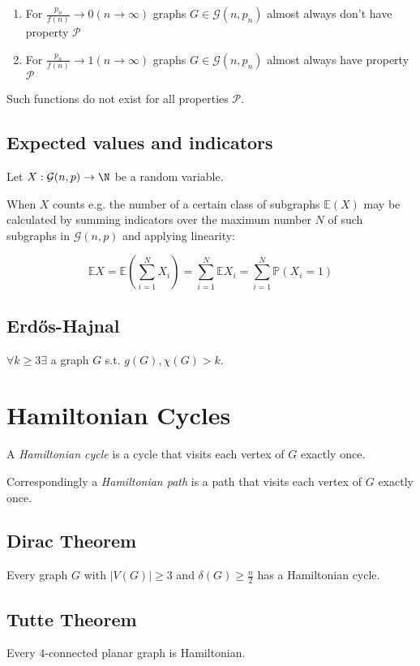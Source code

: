 \begin{enumerate}
	\item For $\frac{p_n}{f(n)} \to 0 (n \to \infty)$ graphs $G \in \mathcal{G}(n,p_n)$ almost always don't have property $\mathcal{P}$
	\item For $\frac{p_n}{f(n)} \to 1 (n \to \infty)$ graphs $G \in \mathcal{G}(n,p_n)$ almost always have property $\mathcal{P}$
\end{enumerate}

Such functions do not exist for all properties $\mathcal{P}$.

\subsection*{Expected values and indicators}

Let $X : \mathcal{G}(n,p) \to \N$ be a random variable.

When $X$ counts e.g. the number of a certain class of subgraphs $\mathbb{E}(X)$ may be calculated by summing indicators over the maximum number $N$ of such subgraphs in $\mathcal{G}(n,p)$ and applying linearity:

\vspace*{-4mm}
$$\mathbb{E}X = \mathbb{E}\left(\sum_{i=1}^N X_i\right) = \sum_{i=1}^N \mathbb{E}X_i = \sum_{i=1}^N \mathbb{P}(X_i=1)$$

\subsection*{Erd\H{o}s-Hajnal}

$\forall k \geq 3 \exists$ a graph $G$ s.t. $g(G), \chi(G) > k$.

\section*{Hamiltonian Cycles}

A \emph{Hamiltonian cycle} is a cycle that visits each vertex of $G$ exactly once.

Correspondingly a \emph{Hamiltonian path} is a path that visits each vertex of $G$ exactly once.

\subsection*{Dirac Theorem}

Every graph $G$ with $|V(G)| \geq 3$ and $\delta(G) \geq \frac{n}{2}$ has a Hamiltonian cycle.

\subsection*{Tutte Theorem}

Every $4$-connected planar graph is Hamiltonian.
